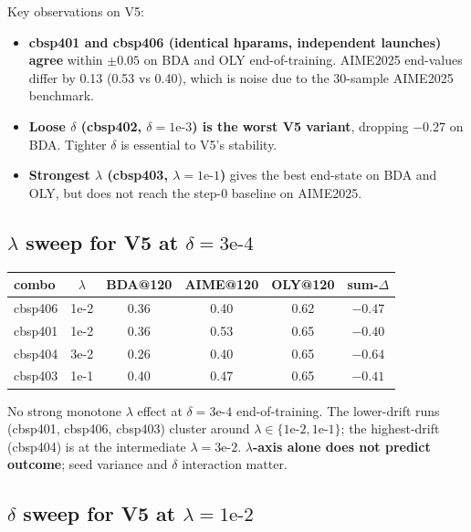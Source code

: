\documentclass[10pt]{article}
\begin{document}
\noindent Key observations on V5:
\begin{itemize}
\item \textbf{cbsp401 and cbsp406 (identical hparams, independent
  launches) agree} within $\pm 0.05$ on BDA and OLY end-of-training.
  AIME2025 end-values differ by 0.13 (0.53 vs 0.40), which is noise
  due to the 30-sample AIME2025 benchmark.
\item \textbf{Loose $\delta$ (cbsp402, $\delta=1\text{e-}3$) is the
  worst V5 variant}, dropping $-0.27$ on BDA. Tighter $\delta$ is
  essential to V5's stability.
\item \textbf{Strongest $\lambda$ (cbsp403, $\lambda=1\text{e-}1$)}
  gives the best end-state on BDA and OLY, but does not reach the
  step-0 baseline on AIME2025.
\end{itemize}

\subsection{$\lambda$ sweep for V5 at $\delta=3\text{e-}4$}

\begin{center}
\begin{tabular}{lccccc}
\toprule
combo    & $\lambda$ & BDA@120 & AIME@120 & OLY@120 & sum-$\Delta$ \\
\midrule
cbsp406  & 1e-2      & 0.36    & 0.40     & 0.62    & $-0.47$ \\
cbsp401  & 1e-2      & 0.36    & 0.53     & 0.65    & $-0.40$ \\
cbsp404  & 3e-2      & 0.26    & 0.40     & 0.65    & $-0.64$ \\
cbsp403  & 1e-1      & 0.40    & 0.47     & 0.65    & $-0.41$ \\
\bottomrule
\end{tabular}
\end{center}

\noindent No strong monotone $\lambda$ effect at $\delta=3\text{e-}4$
end-of-training. The lower-drift runs (cbsp401, cbsp406, cbsp403)
cluster around $\lambda \in \{1\text{e-}2, 1\text{e-}1\}$; the
highest-drift (cbsp404) is at the intermediate $\lambda=3\text{e-}2$.
\textbf{$\lambda$-axis alone does not predict outcome}; seed variance
and $\delta$ interaction matter.

\subsection{$\delta$ sweep for V5 at $\lambda=1\text{e-}2$}
\end{document}

